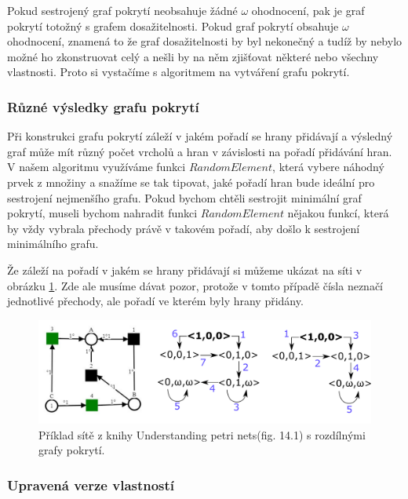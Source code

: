 \documentclass[
  biblatex,
  glossaries,
  printversion
]{kidiplom}
\begin{document}
Pokud sestrojený graf pokrytí neobsahuje žádné $\omega$ ohodnocení,
pak je graf pokrytí totožný s grafem dosažitelnosti. 
Pokud graf pokrytí obsahuje $\omega$ ohodnocení, znamená to že 
graf dosažitelnosti by byl nekonečný a tudíž by nebylo možné 
ho zkonstruovat celý a nešli by na něm zjišťovat některé nebo všechny vlastnosti.
Proto si vystačíme s algoritmem na vytváření grafu pokrytí.

\subsubsection{Různé výsledky grafu pokrytí}

Při konstrukci grafu pokrytí záleží v jakém pořadí se hrany přidávají
a výsledný graf může mít různý počet vrcholů a hran 
v závislosti na pořadí přidávání hran.
V našem algoritmu využíváme funkci $RandomElement$, která vybere 
náhodný prvek z množiny a snažíme se tak tipovat, jaké pořadí hran bude
ideální pro sestrojení nejmenšího grafu. 
Pokud bychom chtěli sestrojit minimální 
graf pokrytí, museli bychom nahradit funkci $RandomElement$ nějakou
funkcí, která by vždy vybrala přechody právě 
v takovém pořadí, aby došlo k sestrojení minimálního grafu.

Že záleží na pořadí v jakém se hrany přidávají si můžeme ukázat na 
síti v obrázku \ref{fig:síť různé coverability}. Zde ale musíme 
dávat pozor, protože v tomto případě čísla neznačí jednotlivé přechody,
ale pořadí ve kterém byly hrany přidány.

\begin{figure}[h]
  \centering
  \includegraphics[width=\linewidth]{net_coverability_difference}
  \caption[Příklad sítě s rozdílnými grafy pokrytí. (fig.  14.1)]{Příklad sítě z knihy Understanding petri nets\cite{reisig2013understanding}(fig.  14.1) s rozdílnými grafy pokrytí. }\label{fig:síť různé coverability}
\end{figure}


\subsubsection{Upravená verze vlastností}\label{Upravená verze vlastností}
\end{document}
